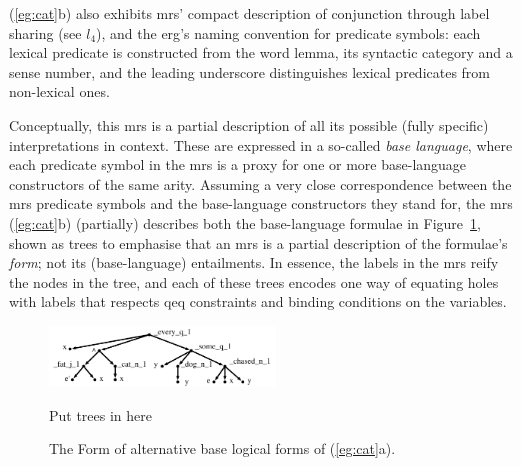 (\ref{eg:cat}b) also exhibits {\sc mrs}' compact description of
conjunction through label sharing (see $l_4$), and the {\sc
  erg}'s naming convention for predicate symbols: each lexical predicate is
constructed from the word lemma, its syntactic category and a sense
number, and the leading underscore distinguishes lexical predicates
from non-lexical ones.

Conceptually, this {\sc mrs} is a partial description of all its
possible (fully specific) interpretations in context.  
These are expressed in a so-called {\em base language}, where each
predicate symbol in the {\sc mrs} is a proxy for one or more
base-language constructors of the same arity.
Assuming a very close
correspondence between the {\sc mrs} predicate symbols and the
base-language constructors they 
stand for, the {\sc mrs}
(\ref{eg:cat}b) (partially) describes both the base-language formulae in
Figure~\ref{fig:1}, shown as trees to emphasise that an {\sc mrs} is a
partial description of the formulae's {\em form}; not its
(base-language) entailments. 
In essence, the labels in the {\sc mrs} reify the
nodes in the tree, and each of these trees encodes one way of equating
holes with labels that respects qeq constraints and binding conditions
on the variables.

\begin{figure}[h]

\includegraphics[width=6cm]{pic-cat-chased-dog}

Put trees in here

\caption{The Form of alternative base logical forms of
  (\ref{eg:cat}a).}
\label{fig:1}
\end{figure}

